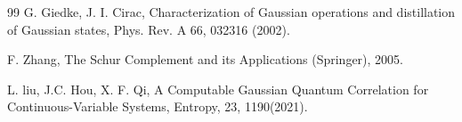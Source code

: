 \documentclass[10pt,aps,pra,amsfonts,amssymb,amsmath,%
floatfix,nofootinbib, groupedaddress,superscriptaddress,citesort,twocolumn
]{revtex4}%
\begin{document}
\begin{thebibliography}{99}
 G. Giedke, J. I. Cirac,
\newblock Characterization of Gaussian operations and distillation of Gaussian states,
\newblock Phys. Rev. A 66, 032316 (2002).


 F. Zhang,
\newblock The Schur Complement and its Applications (Springer), 2005.

 L. liu, J.C. Hou, X. F. Qi,
\newblock A Computable Gaussian Quantum Correlation for
Continuous-Variable Systems,
\newblock  Entropy, 23, 1190(2021).









\end{thebibliography}
\end{document}
